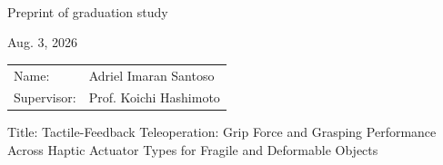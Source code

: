 \documentclass[a4paper, 11pt]{article}
\newcommand\textline[4][t]{%
  \par\smallskip\noindent\parbox[#1]{.333\textwidth}{\raggedright #2}%
  \parbox[#1]{.333\textwidth}{\centering #3}%
  \parbox[#1]{.333\textwidth}{\raggedleft #4}\par\smallskip%
}
\begin{document}
\pagestyle{empty}

\textline[t]{\,\,}{Preprint of graduation study}{Aug. 3, 2026}
\vspace{0.1\baselineskip}
\begin{flushright}
  \begin{tabular}{@{}ll@{}}
    Name:       & Adriel Imaran Santoso  \\
    Supervisor: & Prof. Koichi Hashimoto \\
  \end{tabular}
\end{flushright}
\begin{center}
  Title: Tactile-Feedback Teleoperation: Grip Force and Grasping Performance \\
  Across Haptic Actuator Types for Fragile and Deformable Objects
\end{center}
\vspace{0.2\baselineskip}
\end{document}
